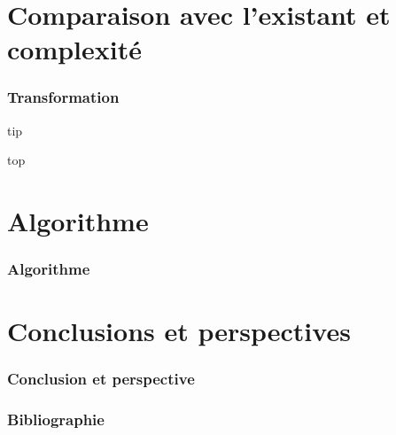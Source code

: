 \documentclass[table]{beamer}
\newcommand{\+}{\cellcolor[gray]{1}\bfseries}
\begin{document}
\section{Comparaison avec l'existant et complexité}

\begin{frame}[allowframebreaks]
  \frametitle{Transformation}

  tip \cite{lanctot2003distinguishing}

  \framebreak

  top \cite{ma2008more}
\end{frame}

\section{Algorithme}

\begin{frame}
  \frametitle{Algorithme}

\end{frame}

\section{Conclusions et perspectives}

\begin{frame}
  \frametitle{Conclusion et perspective}

\end{frame}

\begin{frame}
  \titlepage
\end{frame}

\appendix

\begin{frame}[allowframebreaks]
  \frametitle{Bibliographie}
  
  
\end{frame}
\end{document}
